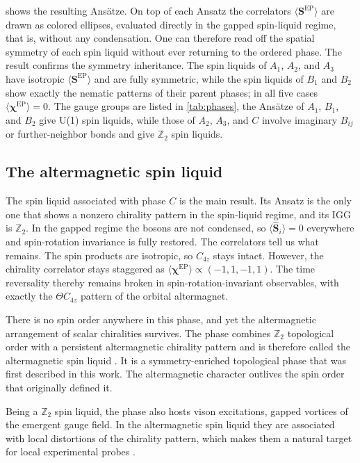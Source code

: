\documentclass[11pt]{article}
\newcommand{\vS}{\boldsymbol{S}}
\newcommand{\SEP}{\boldsymbol{S}^{\mathrm{EP}}}
\newcommand{\chiEP}{\boldsymbol{\chi}^{\mathrm{EP}}}
\begin{document}
 shows the resulting Ansätze. On top of each Ansatz the
correlators $\langle \SEP \rangle$ are drawn as colored ellipses, evaluated
directly in the gapped spin-liquid regime, that is, without any condensation.
One can therefore read off the spatial symmetry of each spin liquid without
ever returning to the ordered phase. The result confirms the symmetry
inheritance. The spin liquids of $A_1$, $A_2$, and $A_3$ have isotropic
$\langle \SEP \rangle$ and are fully symmetric, while the spin liquids of $B_1$
and $B_2$ show exactly the nematic patterns of their parent phases; in all five
cases $\langle \chiEP \rangle = 0$. The gauge groups are listed in
\cref{tab:phases}, the Ansätze of $A_1$, $B_1$, and $B_2$ give U(1) spin
liquids, while those of $A_2$, $A_3$, and $C$ involve imaginary $B_{ij}$ or
further-neighbor bonds and give $\mathbb{Z}_2$ spin liquids.

\subsection{The altermagnetic spin liquid}
\label{sec:amsl}

The spin liquid associated with phase $C$ is the main result. Its Ansatz is the
only one that shows a nonzero chirality pattern in the spin-liquid regime, and
its IGG is $\mathbb{Z}_2$. In the gapped regime the bosons are not condensed,
so $\langle \hat{\vS}_i \rangle = 0$ everywhere and spin-rotation invariance is
fully restored. The correlators tell us what remains. The spin products are
isotropic, so $C_{4z}$ stays intact. However, the chirality correlator
stays staggered as $\langle \chiEP \rangle \propto (-1,1,-1,1)$. The time
reversality thereby remains broken in spin-rotation-invariant observables, with exactly
the $\Theta C_{4z}$ pattern of the orbital altermagnet.

There is no spin order anywhere in this phase, and
yet the altermagnetic arrangement of scalar chiralities survives. The phase
combines $\mathbb{Z}_2$ topological order with a persistent altermagnetic
chirality pattern and is therefore called the altermagnetic spin liquid
\cite{Sobral2025}. It is a symmetry-enriched topological phase that was first
described in this work. The altermagnetic character outlives the spin order
that originally defined it.

Being a $\mathbb{Z}_2$ spin liquid, the phase also hosts vison excitations,
gapped vortices of the emergent gauge field. In the altermagnetic spin liquid
they are associated with local distortions of the chirality pattern, which
makes them a natural target for local experimental probes
\cite{Sobral2025,Jahin2025}.
\end{document}
